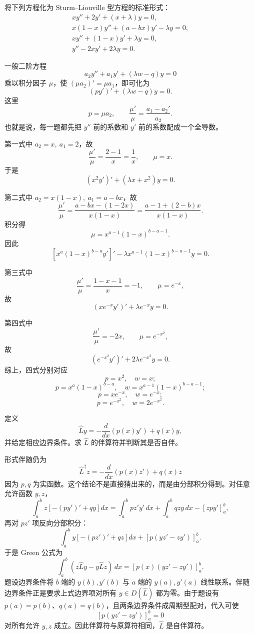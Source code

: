 ﻿


\begin{question}
将下列方程化为 Sturm--Liouville 型方程的标准形式：
\[
\begin{gathered}
xy''+2y'+(x+\lambda)y=0,\\
x(1-x)y''+(a-bx)y'-\lambda y=0,\\
xy''+(1-x)y'+\lambda y=0,\\
y''-2xy'+2\lambda y=0.
\end{gathered}
\]
\begin{solution}
一般二阶方程
\[
a_2y''+a_1y'+(\lambda w-q)y=0
\]
乘以积分因子 \(\mu\)，使 \((\mu a_2)'=\mu a_1\)，即可化为
\[
(py')'+(\lambda w-q)y=0.
\]
这里
\[
p=\mu a_2,\qquad
\frac{\mu'}{\mu}=\frac{a_1-a_2'}{a_2}.
\]
也就是说，每一题都先把 \(y''\) 前的系数和 \(y'\) 前的系数配成一个全导数。

第一式中 \(a_2=x,\ a_1=2\)，故
\[
\frac{\mu'}{\mu}=\frac{2-1}{x}=\frac1x,\qquad \mu=x.
\]
于是
\[
(x^2y')'+(\lambda x+x^2)y=0.
\]

第二式中 \(a_2=x(1-x),\ a_1=a-bx\)，故
\[
\frac{\mu'}{\mu}
=\frac{a-bx-(1-2x)}{x(1-x)}
=\frac{a-1+(2-b)x}{x(1-x)}.
\]
积分得
\[
\mu=x^{a-1}(1-x)^{b-a-1}.
\]
因此
\[
\left[x^a(1-x)^{b-a}y'\right]'
-\lambda x^{a-1}(1-x)^{b-a-1}y=0.
\]

第三式中
\[
\frac{\mu'}{\mu}=\frac{1-x-1}{x}=-1,\qquad \mu=e^{-x},
\]
故
\[
(xe^{-x}y')'+\lambda e^{-x}y=0.
\]

第四式中
\[
\frac{\mu'}{\mu}=-2x,\qquad \mu=e^{-x^2},
\]
故
\[
(e^{-x^2}y')'+2\lambda e^{-x^2}y=0.
\]
综上，四式分别对应
\[
p=x^2,\quad w=x;
\]
\[
p=x^a(1-x)^{b-a},\quad w=x^{a-1}(1-x)^{b-a-1};
\]
\[
p=xe^{-x},\quad w=e^{-x};
\]
\[
p=e^{-x^2},\quad w=2e^{-x^2}.
\]
\end{solution}
\end{question}

\begin{question}
定义
\[
\hat Ly=-\frac d{dx}\left(p(x)y'\right)+q(x)y,
\]
并给定相应边界条件。求 \(\hat L\) 的伴算符并判断其是否自伴。
\begin{solution}
形式伴随仍为
\[
\hat L^\dagger z=-\frac d{dx}\left(p(x)z'\right)+q(x)z
\]
因为 \(p,q\) 为实函数。这个结论不是直接猜出来的，而是由分部积分得到。对任意允许函数 \(y,z\)，
\[
\int_a^b z\left[-(py')'+qy\right]dx
=\int_a^b pz'y'\,dx+\int_a^b qzy\,dx-\left[zpy'\right]_a^b,
\]
再对 \(pz'\) 项反向分部积分：
\[
\int_a^b y\left[-(pz')'+qz\right]dx
+\left[p(yz'-zy')\right]_a^b.
\]
于是 Green 公式为
\[
\int_a^b(z\hat Ly-y\hat Lz)\,dx
=\left[p(x)(yz'-zy')\right]_a^b.
\]
题设边界条件将 \(b\) 端的 \(y(b),y'(b)\) 与 \(a\) 端的 \(y(a),y'(a)\) 线性联系。伴随边界条件正是要求上式边界项对所有 \(y\in D(\hat L)\) 都为零。由于题设有 \(p(a)=p(b)\)、\(q(a)=q(b)\)，且两条边界条件成周期型配对，代入可使
\[
\left[p(yz'-zy')\right]_a^b=0
\]
对所有允许 \(y,z\) 成立。因此伴算符与原算符相同，\(\hat L\) 是自伴算符。
\end{solution}
\end{question}

